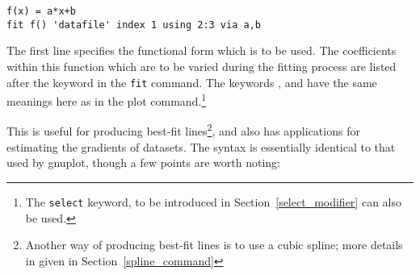 \begin{verbatim}
f(x) = a*x+b
fit f() 'datafile' index 1 using 2:3 via a,b
\end{verbatim}

The first line specifies the functional form which is to be used.  The
coefficients within this function which are to be varied during the fitting
process are listed after the keyword  in the {\tt fit} command.
The keywords ,  and
 have the same meanings here as in the plot
command.\footnote{The {\tt select} keyword, to be introduced in
Section~\ref{select_modifier} can also be used.}

This is useful for producing best-fit lines\footnote{Another way of producing best-fit lines is to use a cubic
spline; more details in given in Section~\ref{spline_command}}, and also has
applications for estimating the gradients of datasets.  The syntax is
essentially identical to that used by gnuplot, though a few points are worth
noting:

